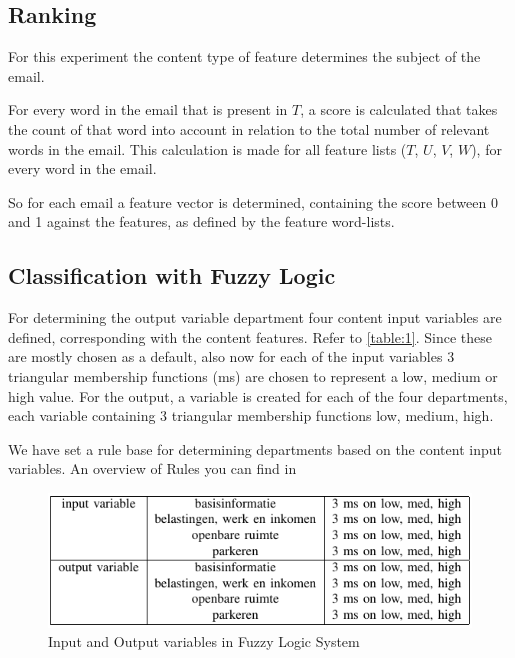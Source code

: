 \documentclass[journal]{IEEEtran}
\begin{document}
\subsection{Ranking}
\label{subsec:ranking}
For this experiment the content type of feature determines the subject of the email.

For every word in the email that is present in $T$, a score is calculated that takes the count of that word into account in relation to the total number of relevant words in the email. This calculation is made for all feature lists ($T$, $U$, $V$, $W$), for every word in the email. 

So for each email a feature vector is determined, containing the score between 0 and 1 against the features, as defined by the feature word-lists. 

\subsection{Classification with Fuzzy Logic}

For determining the output variable department four content input variables are defined, corresponding with the content features. Refer to \autoref{table:1}. Since these are mostly chosen as a default, also now for each of the input variables 3 triangular membership functions (ms) are chosen to represent a low, medium or high value. For the output, a variable is created for each of the four departments, each variable containing 3 triangular membership functions low, medium, high.

We have set a rule base for determining departments based on the content input variables. An overview of Rules you can find in 

\begin{figure}
	\includegraphics[scale=0.6]{res/inputs_outputs_FLS.png}
	\caption{Input and Output variables in Fuzzy Logic System}
	\label{table:1}
\end{figure}
\end{document}
